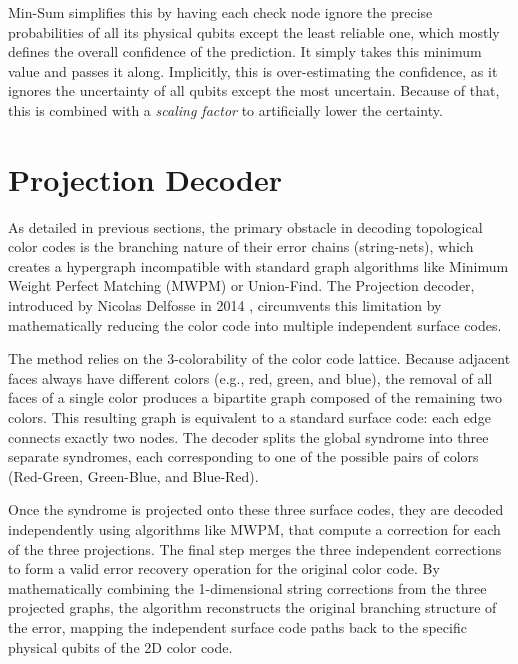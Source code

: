 Min-Sum simplifies this by having each check node ignore the precise probabilities of all its physical qubits except the least reliable one, which mostly defines the overall confidence of the prediction. It simply takes this minimum value and passes it along. Implicitly, this is over-estimating the confidence, as it ignores the uncertainty of all qubits except the most uncertain. Because of that, this is combined with a \textit{scaling factor} to artificially lower the certainty. 


\section{Projection Decoder}
\label{sec:4:projection_decoder}
 As detailed in previous sections, the primary obstacle in decoding topological color codes is the branching nature of their error chains (string-nets), which creates a hypergraph incompatible with standard graph algorithms like Minimum Weight Perfect Matching (MWPM) or Union-Find. The Projection decoder, introduced by Nicolas Delfosse in 2014 \cite{Delfosse_2014}, circumvents this limitation by mathematically reducing the color code into multiple independent surface codes.

 The method relies on the 3-colorability of the color code lattice. Because adjacent faces always have different colors (e.g., red, green, and blue), the removal of all faces of a single color produces a bipartite graph composed of the remaining two colors. This resulting graph is equivalent to a standard surface code: each edge connects exactly two nodes. The decoder splits the global syndrome into three separate syndromes, each corresponding to one of the possible pairs of colors (Red-Green, Green-Blue, and Blue-Red). 

Once the syndrome is projected onto these three surface codes, they are decoded independently using algorithms like MWPM, that compute a correction for each of the three projections. The final step merges the three independent corrections to form a valid error recovery operation for the original color code. By mathematically combining the 1-dimensional string corrections from the three projected graphs, the algorithm reconstructs the original branching structure of the error, mapping the independent surface code paths back to the specific physical qubits of the 2D color code.

